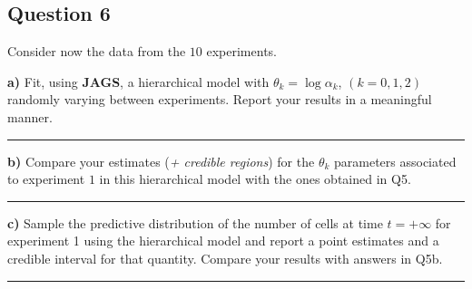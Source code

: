 \subsection*{Question 6}

Consider now the data from the $10$ experiments.

\textbf{a)} Fit, using \textbf{JAGS}, a hierarchical model with $\theta_k = \log{\alpha_k}$, $(k = 0, 1, 2)$ randomly varying between experiments. Report your results in a meaningful manner.

\begin{center}\rule{6cm}{0.4pt}\end{center}

\textbf{b)} Compare your estimates (\textit{+ credible regions}) for the $\theta_k$ parameters associated to experiment $1$ in this hierarchical model with the ones obtained in Q5.

\begin{center}\rule{6cm}{0.4pt}\end{center}

\textbf{c)} Sample the predictive distribution of the number of cells at time $t = +\infty$ for experiment 1 using the hierarchical model and report a point estimates and a credible interval for that quantity. Compare your results with answers in Q5b.

\begin{center}\rule{6cm}{0.4pt}\end{center}